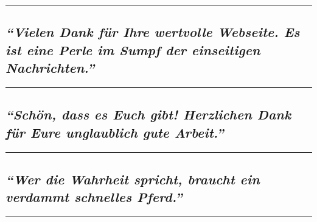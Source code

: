 \begin{center}\rule{0.5\linewidth}{\linethickness}\end{center}

\hypertarget{vielen-dank-fuxfcr-ihre-wertvolle-webseite-es-ist-eine-perle-im-sumpf-der-einseitigen-nachrichten}{%
\subsection{\texorpdfstring{\emph{``Vielen Dank für Ihre wertvolle
Webseite. Es ist eine Perle im Sumpf der einseitigen
Nachrichten.''}}{``Vielen Dank für Ihre wertvolle Webseite. Es ist eine Perle im Sumpf der einseitigen Nachrichten.''}}\label{vielen-dank-fuxfcr-ihre-wertvolle-webseite-es-ist-eine-perle-im-sumpf-der-einseitigen-nachrichten}}

\begin{center}\rule{0.5\linewidth}{\linethickness}\end{center}

\hypertarget{schuxf6n-dass-es-euch-gibt-herzlichen-dank-fuxfcr-eure-unglaublich-gute-arbeit}{%
\subsection{\texorpdfstring{\emph{``Schön, dass es Euch gibt! Herzlichen
Dank für Eure unglaublich gute
Arbeit.''}}{``Schön, dass es Euch gibt! Herzlichen Dank für Eure unglaublich gute Arbeit.''}}\label{schuxf6n-dass-es-euch-gibt-herzlichen-dank-fuxfcr-eure-unglaublich-gute-arbeit}}

\begin{center}\rule{0.5\linewidth}{\linethickness}\end{center}

\hypertarget{wer-die-wahrheit-spricht-braucht-ein-verdammt-schnelles-pferd}{%
\subsection{\texorpdfstring{\emph{``Wer die Wahrheit spricht, braucht
ein verdammt schnelles
Pferd.''}}{``Wer die Wahrheit spricht, braucht ein verdammt schnelles Pferd.''}}\label{wer-die-wahrheit-spricht-braucht-ein-verdammt-schnelles-pferd}}

\begin{center}\rule{0.5\linewidth}{\linethickness}\end{center}

